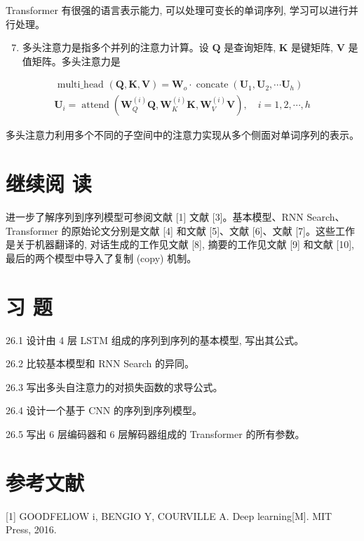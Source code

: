 \documentclass[10pt]{article}
\begin{document}
Transformer 有很强的语言表示能力, 可以处理可变长的单词序列, 学习可以进行并行处理。

\begin{enumerate}
  \setcounter{enumi}{6}
  \item 多头注意力是指多个并列的注意力计算。设 $\boldsymbol{Q}$ 是查询矩阵, $\boldsymbol{K}$ 是键矩阵, $\boldsymbol{V}$ 是值矩阵。多头注意力是
\end{enumerate}

$$
\begin{gathered}
\text { multi_head }(\boldsymbol{Q}, \boldsymbol{K}, \boldsymbol{V})=\boldsymbol{W}_{o} \cdot \operatorname{concate}\left(\boldsymbol{U}_{1}, \boldsymbol{U}_{2}, \cdots \boldsymbol{U}_{h}\right) \\
\boldsymbol{U}_{i}=\operatorname{attend}\left(\boldsymbol{W}_{Q}^{(i)} \boldsymbol{Q}, \boldsymbol{W}_{K}^{(i)} \boldsymbol{K}, \boldsymbol{W}_{V}^{(i)} \boldsymbol{V}\right), \quad i=1,2, \cdots, h
\end{gathered}
$$

多头注意力利用多个不同的子空间中的注意力实现从多个侧面对单词序列的表示。

\section*{继续阅 读}
进一步了解序列到序列模型可参阅文献 [1] 文献 [3]。基本模型、RNN Search、Transformer 的原始论文分别是文献 [4] 和文献 [5]、文献 [6]、文献 [7]。这些工作是关于机器翻译的, 对话生成的工作见文献 [8], 摘要的工作见文献 [9] 和文献 [10], 最后的两个模型中导入了复制 (copy) 机制。

\section*{习 题}
26.1 设计由 4 层 LSTM 组成的序列到序列的基本模型, 写出其公式。

26.2 比较基本模型和 RNN Search 的异同。

26.3 写出多头自注意力的对损失函数的求导公式。

26.4 设计一个基于 CNN 的序列到序列模型。

26.5 写出 6 层编码器和 6 层解码器组成的 Transformer 的所有参数。

\section*{参考文献}
[1] GOODFELlOW i, BENGIO Y, COURVILLE A. Deep learning[M]. MIT Press, 2016.
\end{document}
